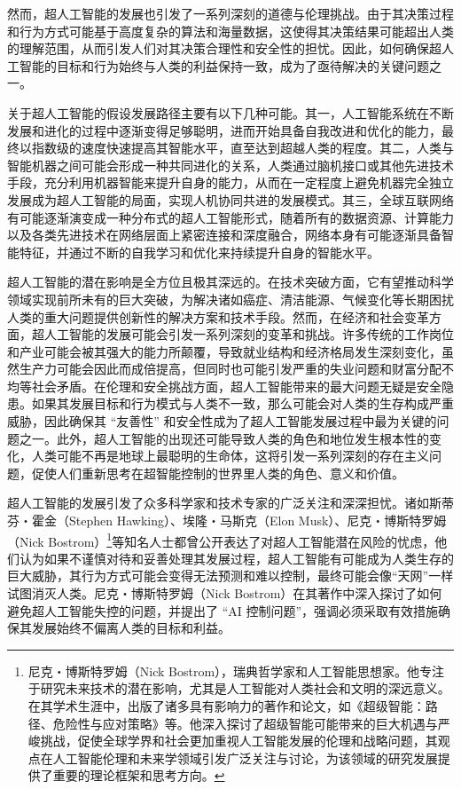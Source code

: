 然而，超人工智能的发展也引发了一系列深刻的道德与伦理挑战。由于其决策过程和行为方式可能基于高度复杂的算法和海量数据，这使得其决策结果可能超出人类的理解范围，从而引发人们对其决策合理性和安全性的担忧。因此，如何确保超人工智能的目标和行为始终与人类的利益保持一致，成为了亟待解决的关键问题之一。


关于超人工智能的假设发展路径主要有以下几种可能。其一，人工智能系统在不断发展和进化的过程中逐渐变得足够聪明，进而开始具备自我改进和优化的能力，最终以指数级的速度快速提高其智能水平，直至达到超越人类的程度。其二，人类与智能机器之间可能会形成一种共同进化的关系，人类通过脑机接口或其他先进技术手段，充分利用机器智能来提升自身的能力，从而在一定程度上避免机器完全独立发展成为超人工智能的局面，实现人机协同共进的发展模式。其三，全球互联网络有可能逐渐演变成一种分布式的超人工智能形式，随着所有的数据资源、计算能力以及各类先进技术在网络层面上紧密连接和深度融合，网络本身有可能逐渐具备智能特征，并通过不断的自我学习和优化来持续提升自身的智能水平。


超人工智能的潜在影响是全方位且极其深远的。在技术突破方面，它有望推动科学领域实现前所未有的巨大突破，为解决诸如癌症、清洁能源、气候变化等长期困扰人类的重大问题提供创新性的解决方案和技术手段。然而，在经济和社会变革方面，超人工智能的发展可能会引发一系列深刻的变革和挑战。许多传统的工作岗位和产业可能会被其强大的能力所颠覆，导致就业结构和经济格局发生深刻变化，虽然生产力可能会因此而成倍提高，但同时也可能引发严重的失业问题和财富分配不均等社会矛盾。在伦理和安全挑战方面，超人工智能带来的最大问题无疑是安全隐患。如果其发展目标和行为模式与人类不一致，那么可能会对人类的生存构成严重威胁，因此确保其 “友善性” 和安全性成为了超人工智能发展过程中最为关键的问题之一。此外，超人工智能的出现还可能导致人类的角色和地位发生根本性的变化，人类可能不再是地球上最聪明的生命体，这将引发一系列深刻的存在主义问题，促使人们重新思考在超智能控制的世界里人类的角色、意义和价值。


超人工智能的发展引发了众多科学家和技术专家的广泛关注和深深担忧。诸如斯蒂芬・霍金（Stephen Hawking）、埃隆・马斯克（Elon Musk）、尼克・博斯特罗姆（Nick Bostrom）\footnote{尼克・博斯特罗姆（Nick Bostrom），瑞典哲学家和人工智能思想家。他专注于研究未来技术的潜在影响，尤其是人工智能对人类社会和文明的深远意义。在其学术生涯中，出版了诸多具有影响力的著作和论文，如《超级智能：路径、危险性与应对策略》等。他深入探讨了超级智能可能带来的巨大机遇与严峻挑战，促使全球学界和社会更加重视人工智能发展的伦理和战略问题，其观点在人工智能伦理和未来学领域引发广泛关注与讨论，为该领域的研究发展提供了重要的理论框架和思考方向。}等知名人士都曾公开表达了对超人工智能潜在风险的忧虑，他们认为如果不谨慎对待和妥善处理其发展过程，超人工智能有可能成为人类生存的巨大威胁，其行为方式可能会变得无法预测和难以控制，最终可能会像“天网”一样试图消灭人类。尼克・博斯特罗姆（Nick Bostrom）在其著作中深入探讨了如何避免超人工智能失控的问题，并提出了 “AI 控制问题”，强调必须采取有效措施确保其发展始终不偏离人类的目标和利益。


